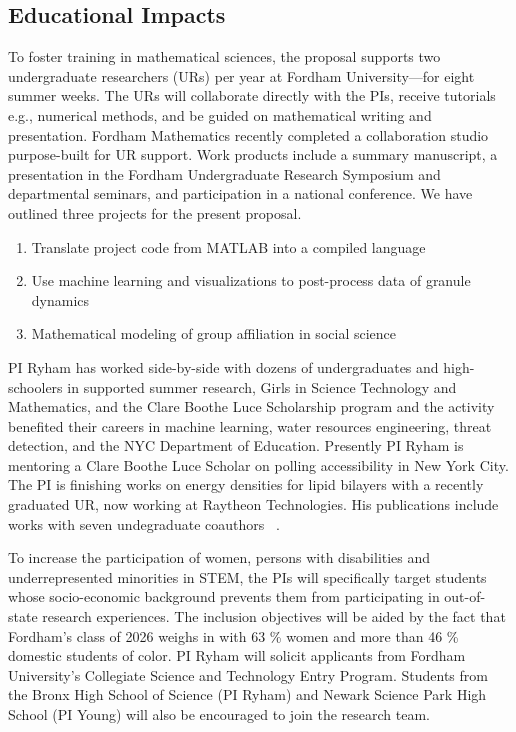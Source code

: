 \subsection{Educational Impacts}
\label{subsec:Educational_plans}
To foster training in mathematical sciences,
the proposal supports two undergraduate researchers
(URs) per year at Fordham University---for eight summer weeks.
The URs will collaborate directly with the PIs,
receive tutorials e.g., numerical methods,
and be guided on mathematical writing and presentation.
Fordham Mathematics recently completed a collaboration studio 
purpose-built for UR support.
Work products include a summary manuscript,
a presentation in the Fordham Undergraduate Research Symposium
and departmental seminars, and participation in a national conference.
We have outlined three projects for the present proposal.
\begin{enumerate}[noitemsep,topsep=0pt]
\item Translate project code from MATLAB into a compiled language 
\item Use machine learning and visualizations to post-process data of granule dynamics
\item Mathematical modeling of group affiliation in social science  
\end{enumerate}
PI Ryham has worked side-by-side with dozens of
undergraduates and high-schoolers in
supported summer research, Girls in Science Technology and Mathematics,
and the Clare Boothe Luce Scholarship program
and the activity benefited their careers in
machine learning, water resources engineering, threat detection,
and the NYC Department of Education.
Presently PI Ryham is mentoring a Clare Boothe Luce Scholar on
polling accessibility in New York City.
The PI is finishing works on energy densities for lipid  bilayers
with a recently graduated UR, now working at Raytheon Technologies.
His publications include works
with seven undegraduate coauthors
~\cite{Figueroa2012CuttingCI, RYHAM20112929, RyWaCo13, RyKlYaCo16}.


To increase the participation of women,
persons with disabilities and underrepresented minorities in STEM,
the PIs will specifically target students
whose socio-economic background prevents them from participating in
out-of-state research experiences.
The inclusion objectives will be aided by the fact that  
Fordham's class of 2026 weighs in with 63 \% women
and more than 46 \% domestic students of color. 
PI Ryham will solicit applicants from
Fordham University's Collegiate Science and Technology Entry Program.
Students from the Bronx High School of Science (PI Ryham) and Newark
Science Park High School (PI Young) will also be encouraged to join the
research team. 

